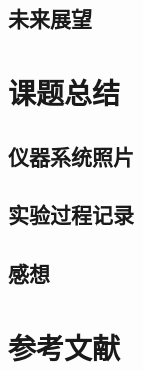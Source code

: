 \documentclass[12pt,hyperref,a4paper,UTF8]{ctexart}
\begin{document}
\subsection{未来展望}

\section{课题总结}
\subsection{仪器系统照片}

\subsection{实验过程记录}

\subsection{感想}


\section{参考文献}

\end{document}
